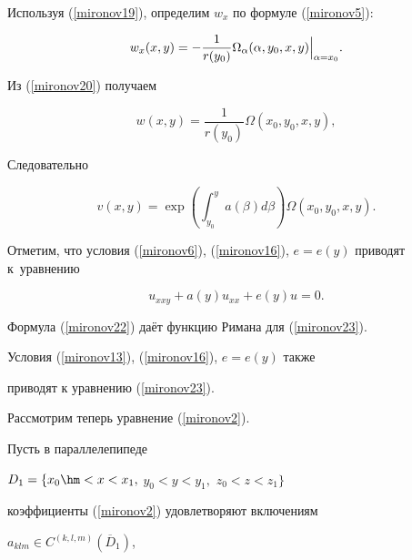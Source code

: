Используя (\ref{mironov19}), определим $w_{x}$ по формуле (\ref{mironov5}):


\begin{equation}\label{mironov20}


w_{x}(x,y)=-\frac{1}{r(y_{0})}


\Omega_{\alpha}(\alpha,y_{0}, x,y)\Bigl\vert_{\alpha=x_{0}}\Bigr. .


\end{equation}


Из (\ref{mironov20}) получаем


\begin{equation}\label{mironov21}


w(x,y)=\frac{1}{r(y_{0})}\Omega(x_{0}, y_{0}, x,y),


\end{equation}


Следовательно


\begin{equation}\label{mironov22}


v(x,y)=\exp\left( \int_{y_{0}}^{y}


a(\beta) d\beta\right)\Omega(x_{0}, y_{0}, x,y).


\end{equation}





Отметим, что условия (\ref{mironov6}), (\ref{mironov16}), $e=e(y)$ приводят к~уравнению


\begin{equation}\label{mironov23}


u_{xxy}+a(y)u_{xx}+e(y)u=0.


\end{equation}


Формула (\ref{mironov22}) даёт функцию Римана для (\ref{mironov23}).


Условия (\ref{mironov13}), (\ref{mironov16}), $e=e(y)$ также


приводят к уравнению (\ref{mironov23}).





 Рассмотрим теперь уравнение (\ref{mironov2}).


Пусть в параллелепипеде


$D_1=\{x_{0}\hm<x<x_{1},$ $y_{0}<y<y_{1},$ $z_{0}<z<z_{1}\}$


коэффициенты (\ref{mironov2}) удовлетворяют включениям


$a_{klm}\in C^{(k,l,m)}(\overline{D}_1)$,


